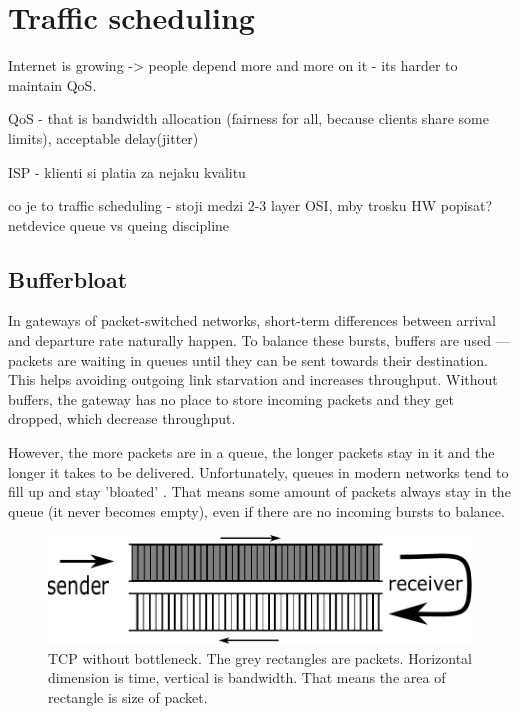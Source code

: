 \chapter{Traffic scheduling}
\label{chap:gf}

Internet is growing -> people depend more and more on it - its harder to maintain QoS.

 QoS - that is bandwidth allocation (fairness for all, because clients share some limits), acceptable delay(jitter)
 
ISP - klienti si platia za nejaku kvalitu

co je to traffic scheduling - stoji medzi 2-3 layer OSI, mby trosku HW popisat? netdevice queue vs queing discipline 

\section{Bufferbloat}
\label{chap:bb}

In gateways of packet-switched networks, short-term differences between arrival and departure rate naturally happen. To balance these bursts, buffers are used --- packets are waiting in queues until they can be sent towards their destination. This helps avoiding outgoing link starvation and increases throughput. Without buffers, the gateway has no place to store incoming packets and they get dropped, which decrease throughput.


However, the more packets are in a queue, the longer packets stay in it and the longer it takes to be delivered. Unfortunately, queues in modern networks tend to fill up and stay 'bloated' \cite{Gettys:2012:BDB:2063176.2063196}. That means some amount of packets always stay in the queue (it never becomes empty), even if there are no incoming bursts to balance.

\begin{figure}
	\centering

\includegraphics[width=137mm]{drawings/tcp_no_bottleneck}
\caption{TCP without bottleneck. The grey rectangles are packets. Horizontal dimension is time, vertical is bandwidth. That means the area of rectangle is size of packet.}

\label{fig01:no_bottle}
\end{figure}

